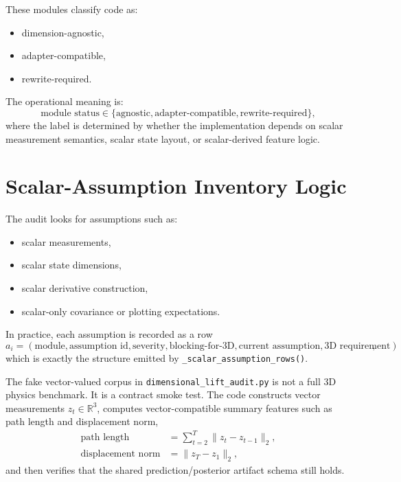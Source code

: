 \documentclass[11pt]{article}
\begin{document}
These modules classify code as:
\begin{itemize}[leftmargin=1.5em]
    \item dimension-agnostic,
    \item adapter-compatible,
    \item rewrite-required.
\end{itemize}

The operational meaning is:
\begin{equation}
    \text{module status}
    \in
    \{
        \text{agnostic},
        \text{adapter-compatible},
        \text{rewrite-required}
    \},
\end{equation}
where the label is determined by whether the implementation depends on scalar
measurement semantics, scalar state layout, or scalar-derived feature logic.

\section{Scalar-Assumption Inventory Logic}

The audit looks for assumptions such as:
\begin{itemize}[leftmargin=1.5em]
    \item scalar measurements,
    \item scalar state dimensions,
    \item scalar derivative construction,
    \item scalar-only covariance or plotting expectations.
\end{itemize}

In practice, each assumption is recorded as a row
\begin{equation}
    a_i =
    (
        \text{module},
        \text{assumption id},
        \text{severity},
        \text{blocking-for-3D},
        \text{current assumption},
        \text{3D requirement}
    ),
\end{equation}
which is exactly the structure emitted by
\texttt{\_scalar\_assumption\_rows()}.

The fake vector-valued corpus in \texttt{dimensional\_lift\_audit.py} is not a
full 3D physics benchmark. It is a contract smoke test. The code constructs
vector measurements \(z_t \in \mathbb{R}^3\), computes vector-compatible summary
features such as path length and displacement norm,
\begin{align}
    \text{path length} &= \sum_{t=2}^{T} \lVert z_t - z_{t-1} \rVert_2, \\
    \text{displacement norm} &= \lVert z_T - z_1 \rVert_2,
\end{align}
and then verifies that the shared prediction/posterior artifact schema still
holds.
\end{document}

